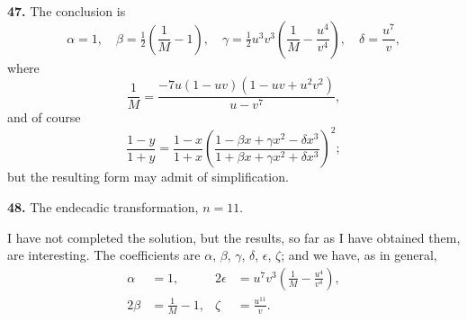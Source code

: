 \documentclass[12pt,a4paper]{article}
\begin{document}
\textbf{47.} The conclusion is
\[
\alpha = 1, \quad \beta = \tfrac{1}{2}\left(\frac{1}{M} - 1\right), \quad
\gamma = \tfrac{1}{2}u^3 v^3\left(\frac{1}{M} - \frac{u^4}{v^4}\right), \quad
\delta = \frac{u^7}{v},
\]
where
\[
\frac{1}{M} = \frac{-7u(1 - uv)(1 - uv + u^2 v^2)}{u - v^7},
\]
and of course
\[
\frac{1 - y}{1 + y} = \frac{1 - x}{1 + x}
\left(\frac{1 - \beta x + \gamma x^2 - \delta x^3}
{1 + \beta x + \gamma x^2 + \delta x^3}\right)^2;
\]
but the resulting form may admit of simplification.

\textbf{48.} The endecadic transformation, $n = 11$.

I have not completed the solution, but the results, so far as I have obtained them, are interesting. The coefficients are $\alpha$, $\beta$, $\gamma$, $\delta$, $\epsilon$, $\zeta$; and we have, as in general,
\begin{align*}
\alpha &= 1, & 2\epsilon &= u^7 v^3\left(\frac{1}{M} - \frac{u^4}{v^4}\right), \\
2\beta &= \frac{1}{M} - 1, & \zeta &= \frac{u^{11}}{v}.
\end{align*}
\end{document}
